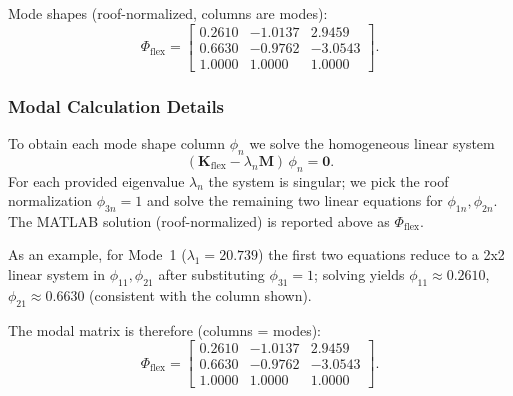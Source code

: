 \documentclass[12pt,a4paper]{article}
\newcommand{\mat}[1]{\mathbf{#1}}
\begin{document}
Mode shapes (roof-normalized, columns are modes):
\begin{equation}
  \Phi_{\text{flex}} = \begin{bmatrix}0.2610 & -1.0137 & 2.9459\\0.6630 & -0.9762 & -3.0543\\1.0000 & 1.0000 & 1.0000\end{bmatrix}.
\end{equation}

\subsubsection*{Modal Calculation Details}
To obtain each mode shape column $\phi_n$ we solve the homogeneous linear system
\begin{equation}
  (\mat{K}_{\text{flex}} - \lambda_n\mat{M})\,\phi_n = \mathbf{0}.
\end{equation}
For each provided eigenvalue $\lambda_n$ the system is singular; we pick the roof normalization $\phi_{3n}=1$ and solve the remaining two linear equations for $\phi_{1n},\phi_{2n}$. The MATLAB solution (roof-normalized) is reported above as $\Phi_{\text{flex}}$.

As an example, for Mode~1 ($\lambda_1=20.739$) the first two equations reduce to a 2x2 linear system in $\phi_{11},\phi_{21}$ after substituting $\phi_{31}=1$; solving yields $\phi_{11}\approx0.2610$, $\phi_{21}\approx0.6630$ (consistent with the column shown).

The modal matrix is therefore (columns = modes):
\begin{equation}
  \Phi_{\text{flex}} = \begin{bmatrix}0.2610 & -1.0137 & 2.9459\\0.6630 & -0.9762 & -3.0543\\1.0000 & 1.0000 & 1.0000\end{bmatrix}.
\end{equation}
\end{document}

